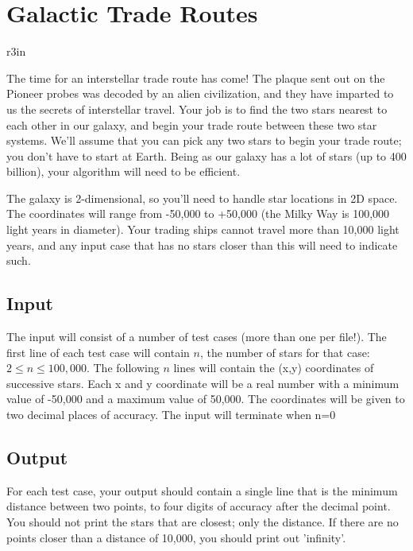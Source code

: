 \documentclass[11pt]{article}
\begin{document}
\section*{Galactic Trade Routes}


\begin{wrapfigure}{r}{3in}
\vspace{-10pt}
\vspace{-30pt}
\end{wrapfigure}

The time for an interstellar trade route has come! The plaque sent out on the Pioneer probes was decoded by an alien civilization, and they have imparted to us the secrets of interstellar travel. Your job is to find the two stars nearest to each other in our galaxy, and begin your trade route between these two star systems. We’ll assume that you can pick any two stars to begin your trade route; you don’t have to start at Earth. Being as our galaxy has a lot of stars (up to 400 billion), your algorithm will need to be efficient.

The galaxy is 2-dimensional, so you'll need to handle star locations in 2D space. The coordinates will range from -50,000 to +50,000 (the Milky Way is 100,000 light years in diameter). Your trading ships cannot travel more than 10,000 light years, and any input case that has no stars closer than this will need to indicate such.


\subsection*{Input}
The input will consist of a number of test cases (more than one per file!). The first line of each test case will contain $n$, the number of stars for that case: $2 \leq n \leq 100,000$. The following $n$ lines will contain the (x,y) coordinates of successive stars. Each x and y coordinate will be a real number with a minimum value of -50,000 and a maximum value of 50,000. The coordinates will be given to two decimal places of accuracy. The input will terminate when n=0

\subsection*{Output}
For each test case, your output should contain a single line that is the minimum distance between two points, to four digits of accuracy after the decimal point. You should not print the stars that are closest; only the distance. If there are no points closer than a distance of 10,000, you should print out ’infinity’.
\end{document}
